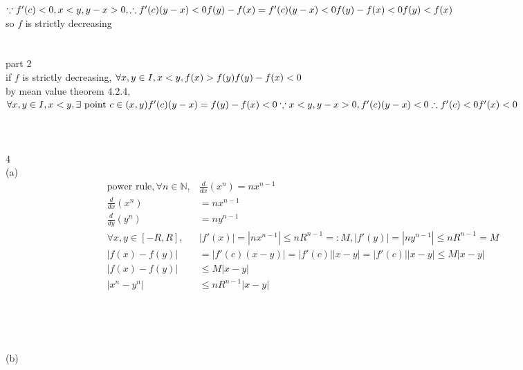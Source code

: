 \documentclass[12pt, border = 4pt, multi]{article} %
\begin{document}
$\because f'(c) < 0, x < y, y - x > 0, \therefore f'(c)(y - x) < 0\\
f(y) - f(x) = f'(c)(y - x) < 0\\
f(y) - f(x) < 0\\
f(y) < f(x)$\\
so $f$ is strictly decreasing\\
\\
\\
part 2\\
if $f$ is strictly decreasing, $\forall x, y \in I, x < y, f(x) > f(y)\\
f(y) - f(x) < 0$\\
by mean value theorem 4.2.4, $\forall x, y \in I, x < y, \exists \text{ point } c \in (x, y)\\
f'(c)(y - x) = f(y) - f(x) < 0\\
\because x < y, y - x > 0, f'(c)(y - x) < 0\\
\therefore f'(c) < 0\\
f'(x) < 0\\$
\\
\\
\\
\\
4\\
(a)
\begin{align*}
\text{power rule}, \forall n \in \mathbb{N}, &\frac{d}{dx}(x ^ n) = nx ^ {n - 1}\\
\frac{d}{dx}(x ^ n) &= nx ^ {n - 1}\\
\frac{d}{dy}(y ^ n) &= ny ^ {n - 1}\\
\forall x, y \in [-R, R], &|f'(x)| = |nx ^ {n - 1}| \leq nR ^ {n - 1} =: M, |f'(y)| = |ny ^ {n - 1}| \leq nR ^ {n - 1} = M\\
|f(x) - f(y)| &= |f'(c)(x - y)| = |f'(c)||x - y| = |f'(c)||x - y| \leq M|x - y|\\
|f(x) - f(y)| &\leq M|x - y|\\
|x ^ n - y ^ n| &\leq nR ^ {n - 1}|x - y|\\
\end{align*}
\\
\\
\\
\\
(b)
\end{document}
